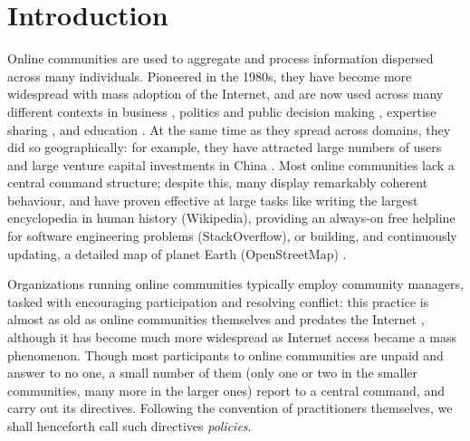 \documentclass{article}
\begin{document}
\maketitle


\section{Introduction}\label{sec:intro}


Online communities are used to aggregate and process information dispersed across many individuals. Pioneered in the 1980s, they have become more widespread with mass adoption of the Internet, and are now used across many different contexts in business \cite{mcwilliam2012building, tapscott2008wikinomics}, politics and public decision making \cite{rheingold1993virtual, noveck2009wiki, cottica2010wikicrazia}, expertise sharing \cite{rheingold1993virtual, zhang2007expertise, shirky2008here}, and education \cite{milligan2013patterns}. At the same time as they spread across domains, they did so geographically: for example, they have attracted large numbers of users and large venture capital investments in China \cite{zhou2011social}. Most online communities lack a central command structure; despite this, many display remarkably coherent behaviour, and have proven effective at large tasks like writing the largest encyclopedia in human history (Wikipedia), providing an always-on free helpline for software engineering problems (StackOverflow), or building, and continuously updating, a detailed map of planet Earth (OpenStreetMap) \cite{shirky2008here}. 

Organizations running online communities typically employ community managers, tasked with encouraging participation and resolving conflict: this practice is almost as old as online communities themselves and predates the Internet \cite{rheingold1993virtual}, although it has become much more widespread as Internet access became a mass phenomenon. Though most participants to online communities are unpaid and answer to no one, a small number of them (only one or two in the smaller communities, many more in the larger ones) report to a central command, and carry out its directives. Following the convention of practitioners themselves, we shall henceforth call such directives \emph{policies}. 
\end{document}
